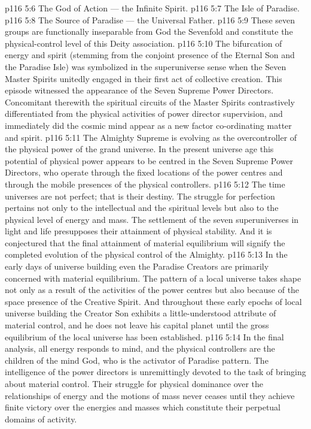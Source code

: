 \vs p116 5:6 \bibnobreakspace The God of Action --- the Infinite Spirit.
\vs p116 5:7 \bibnobreakspace The Isle of Paradise.
\vs p116 5:8 \bibnobreakspace The Source of Paradise --- the Universal Father.
\vs p116 5:9 These seven groups are functionally inseparable from God the Sevenfold and constitute the physical\hyp{}control level of this Deity association.
\vs p116 5:10 \pc The bifurcation of energy and spirit (stemming from the conjoint presence of the Eternal Son and the Paradise Isle) was symbolized in the superuniverse sense when the Seven Master Spirits unitedly engaged in their first act of collective creation. This episode witnessed the appearance of the Seven Supreme Power Directors. Concomitant therewith the spiritual circuits of the Master Spirits contrastively differentiated from the physical activities of power director supervision, and immediately did the cosmic mind appear as a new factor co\hyp{}ordinating matter and spirit.
\vs p116 5:11 The Almighty Supreme is evolving as the overcontroller of the physical power of the grand universe. In the present universe age this potential of physical power appears to be centred in the Seven Supreme Power Directors, who operate through the fixed locations of the power centres and through the mobile presences of the physical controllers.
\vs p116 5:12 \pc The time universes are not perfect; that is their destiny. The struggle for perfection pertains not only to the intellectual and the spiritual levels but also to the physical level of energy and mass. The settlement of the seven superuniverses in light and life presupposes their attainment of physical stability. And it is conjectured that the final attainment of material equilibrium will signify the completed evolution of the physical control of the Almighty.
\vs p116 5:13 In the early days of universe building even the Paradise Creators are primarily concerned with material equilibrium. The pattern of a local universe takes shape not only as a result of the activities of the power centres but also because of the space presence of the Creative Spirit. And throughout these early epochs of local universe building the Creator Son exhibits a little\hyp{}understood attribute of material control, and he does not leave his capital planet until the gross equilibrium of the local universe has been established.
\vs p116 5:14 \pc In the final analysis, all energy responds to mind, and the physical controllers are the children of the mind God, who is the activator of Paradise pattern. The intelligence of the power directors is unremittingly devoted to the task of bringing about material control. Their struggle for physical dominance over the relationships of energy and the motions of mass never ceases until they achieve finite victory over the energies and masses which constitute their perpetual domains of activity.

